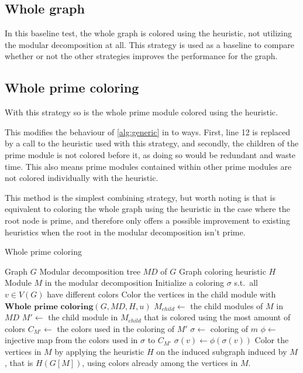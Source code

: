 \documentclass[a4paper]{article}
\begin{document}
\subsection{Whole graph}

In this baseline test, the whole graph is colored using the heuristic, not
utilizing the modular decomposition at all. This strategy is used as a baseline
to compare whether or not the other strategies improves the performance for the
graph.

\subsection{Whole prime coloring}

With this strategy so is the whole prime module colored using the heuristic. 

This modifies the behaviour of \autoref{alg:generic} in to ways. First, line 12 is replaced by a
call to the heuristic used with this strategy, and secondly, the children of the prime
module is not colored before it, as doing so would be redundant and waste time.
This also means prime modules contained within other prime modules are not
colored individually with the heuristic.

This method is the simplest combining strategy, but worth noting is that is
equivalent to coloring the whole graph using the heuristic in the case where the
root node is prime, and therefore only offers a possible improvement to existing
heuristics when the root in the modular decomposition isn't prime.

\begin{algorithm}[H]
  \caption{Whole prime coloring}
  \label{alg:wpc}
  \begin{algorithmic}[1]
    \REQUIRE Graph $G$ 
    \REQUIRE Modular decomposition tree $MD$ of $G$
    \REQUIRE Graph coloring heuristic $H$
    \REQUIRE Module $M$ in the modular decomposition
    \STATE Initialize a coloring $\sigma$ s.t.\ all $v \in V(G)$
           have different colors
            \STATE Color the vertices in the child module with $\textbf{Whole prime coloring}(G,MD,H,u)$
        \ENDFOR
          \STATE $M_{child} \leftarrow $ the child modules of $M$ in $MD$
          \STATE $M' \leftarrow $ the child module in $M_{child}$ that is colored using the most amount of colors
          \STATE $C_{M'} \leftarrow $ the colors used in the coloring of $M'$
             \STATE $\sigma \leftarrow $ coloring of $m$
             \STATE $\phi \leftarrow $ injective map from the colors used in $\sigma$ to $C_{M'}$
                \STATE $\sigma(v)\leftarrow \phi(\sigma(v))$  
             \ENDFOR
          \ENDFOR
        \ENDIF
    \ELSE
        \STATE Color the vertices in $M$ by applying the heuristic $H$ on the induced subgraph induced by $M$,
        that is $H(G[M])$, using colors already among the vertices in $M$.
    \ENDIF
  \end{algorithmic}
\end{algorithm}
\end{document}
